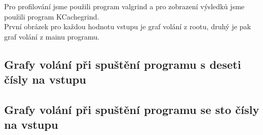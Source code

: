 \documentclass[11pt,a4paper,titlepage]{article}
\begin{document}
	Pro profilování jsme použili program valgrind a pro zobrazení výsledků jsme použili program KCachegrind. \\
	První obrázek pro každou hodnotu vstupu je graf volání z rootu, druhý je pak graf volání z mainu programu.

	\subsection{Grafy volání při spuštění programu s deseti čísly na vstupu}

	\begin{figure}[ht]
		\centering
	\end{figure}
	\begin{figure}[ht]
		\centering
	\end{figure}

	\newpage

	\subsection{Grafy volání při spuštění programu se sto čísly na vstupu}
\end{document}
